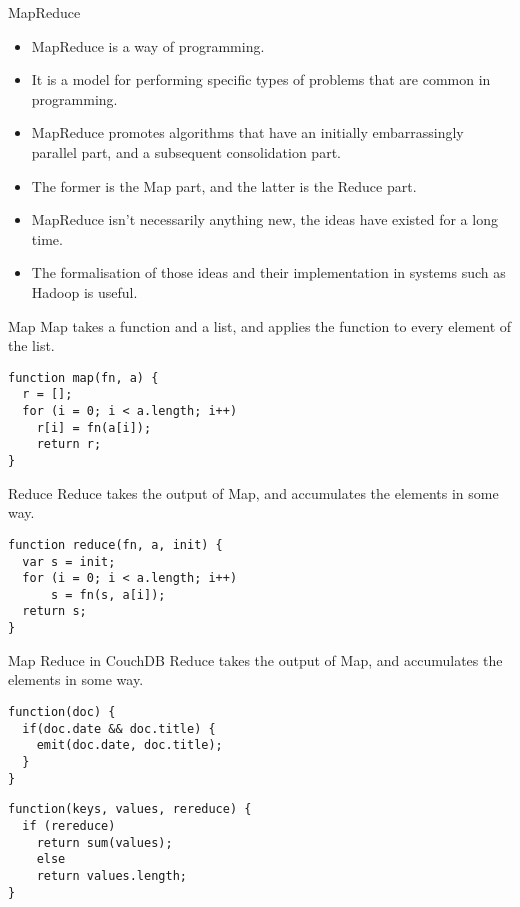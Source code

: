 \begin{frame}{MapReduce}
	\begin{itemize}
		\item MapReduce is a way of programming.
		\item It is a model for performing specific types of problems that are common in programming.
		\item MapReduce promotes algorithms that have an initially embarrassingly parallel part, and a subsequent consolidation part.
		\item The former is the Map part, and the latter is the Reduce part.
		\item MapReduce isn't necessarily anything new, the ideas have existed for a long time.
		\item The formalisation of those ideas and their implementation in systems such as Hadoop is useful.
	\end{itemize}
\end{frame}


\begin{frame}[fragile]{Map}
Map takes a function and a list, and applies the function to every element of the list.
  \begin{verbatim}
function map(fn, a) {
  r = [];
  for (i = 0; i < a.length; i++)
  	r[i] = fn(a[i]);
	return r;
}
	\end{verbatim}
\end{frame}


\begin{frame}[fragile]{Reduce}
Reduce takes the output of Map, and accumulates the elements in some way.
  \begin{verbatim}
function reduce(fn, a, init) {
  var s = init;
  for (i = 0; i < a.length; i++)
      s = fn(s, a[i]);
  return s;
}
	\end{verbatim}
\end{frame}


\begin{frame}[fragile]{Map Reduce in CouchDB}
Reduce takes the output of Map, and accumulates the elements in some way.
  \begin{verbatim}
function(doc) {
  if(doc.date && doc.title) {
    emit(doc.date, doc.title);
  }
}
	\end{verbatim}
	
  \begin{verbatim}
function(keys, values, rereduce) {
  if (rereduce)
    return sum(values);
	else
    return values.length;
}
	\end{verbatim}
	

\end{frame}


